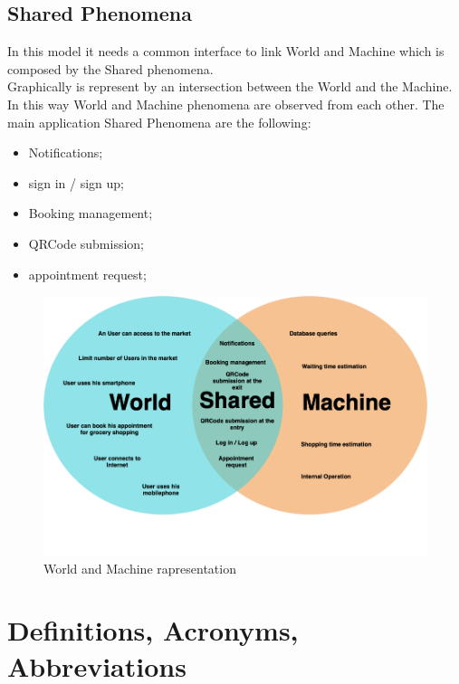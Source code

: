 \subsection{Shared Phenomena} 
In this model it needs a common interface to link World and Machine which is composed by the Shared phenomena. \\
Graphically is represent by an intersection between the World and the Machine. In this way World and Machine phenomena are observed from each other.  
The main application Shared Phenomena are the following:
\begin{itemize}
\item Notifications;
\item sign in / sign up;
\item Booking management;
\item QRCode submission;
\item appointment request;
\end{itemize}
\begin{figure}[H]
  \caption{World and Machine rapresentation}
  \centering
  \includegraphics[scale = 0.38]{diagrams/VENN.png}
\end{figure}
\pagebreak
\section{Definitions, Acronyms, Abbreviations}
